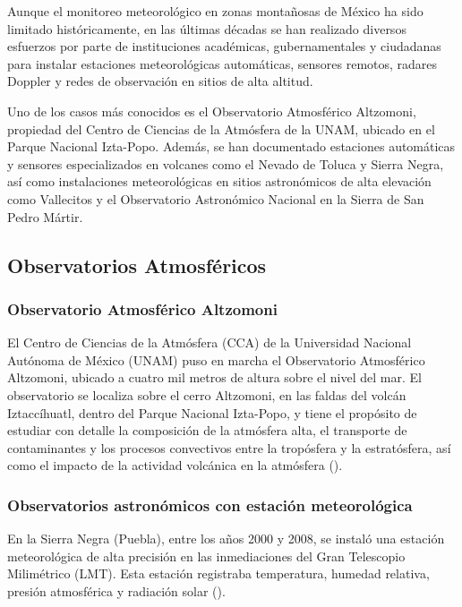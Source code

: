 Aunque el monitoreo meteorológico en zonas montañosas de México ha sido limitado históricamente, en las últimas décadas se han realizado diversos esfuerzos por parte de instituciones académicas, gubernamentales y ciudadanas para instalar estaciones meteorológicas automáticas, sensores remotos, radares Doppler y redes de observación en sitios de alta altitud.

Uno de los casos más conocidos es el Observatorio Atmosférico Altzomoni, propiedad del Centro de Ciencias de la Atmósfera de la UNAM, ubicado en el Parque Nacional Izta-Popo. Además, se han documentado estaciones automáticas y sensores especializados en volcanes como el Nevado de Toluca y Sierra Negra, así como instalaciones meteorológicas en sitios astronómicos de alta elevación como Vallecitos y el Observatorio Astronómico Nacional en la Sierra de San Pedro Mártir.





\subsection{Observatorios Atmosféricos}

\subsubsection{Observatorio Atmosférico Altzomoni}

El Centro de Ciencias de la Atmósfera (CCA) de la Universidad Nacional Autónoma de México (UNAM) puso en marcha el Observatorio Atmosférico Altzomoni, ubicado a cuatro mil metros de altura sobre el nivel del mar. El observatorio se localiza sobre el cerro Altzomoni, en las faldas del volcán Iztaccíhuatl, dentro del Parque Nacional Izta-Popo, y tiene el propósito de estudiar con detalle la composición de la atmósfera alta, el transporte de contaminantes y los procesos convectivos entre la tropósfera y la estratósfera, así como el impacto de la actividad volcánica en la atmósfera  (\cite{sedema2025}).

\subsubsection{Observatorios astronómicos con estación meteorológica}

En la Sierra Negra (Puebla), entre los años 2000 y 2008, se instaló una estación meteorológica de alta precisión en las inmediaciones del Gran Telescopio Milimétrico (LMT). Esta estación registraba temperatura, humedad relativa, presión atmosférica y radiación solar  (\cite{granicus2009}).

